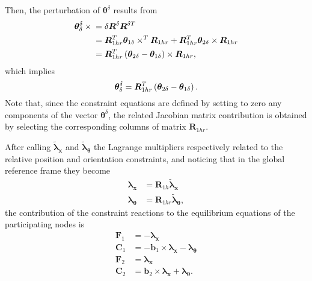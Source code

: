 \documentclass[10pt,fleqn,subeqn]{report}
\newcommand{\T}[1]{\bm{#1}}
\begin{document}
Then, the perturbation of $\T{\theta}^{\delta}$ results from
\begin{align}
	\T{\theta}^{\delta}_{\delta} \times{}
	&= \delta\T{R}^{\delta} \T{R}^{\delta T} \nonumber \\
	&= \T{R}_{1hr}^T \T{\theta}_{1\delta}\times^T \T{R}_{1hr}
	+ \T{R}_{1hr}^T \T{\theta}_{2\delta}\times \T{R}_{1hr} \nonumber \\
	&= \T{R}_{1hr}^T \plbr{
		\T{\theta}_{2\delta} - \T{\theta}_{1\delta}
	} \times \T{R}_{1hr} ,
\end{align}
which implies
\begin{equation}
	\T{\theta}^{\delta}_{\delta} = \T{R}_{1hr}^T \plbr{
		\T{\theta}_{2\delta} - \T{\theta}_{1\delta}
	} .
\end{equation}
Note that, since the constraint equations are defined by setting 
to zero any components of the vector $\T{\theta}^{\delta}$, the
related Jacobian matrix contribution is obtained by selecting 
the corresponding columns of matrix $\T{R}_{1hr}$.


After calling $\tilde{\T{\lambda}}_{\T{x}}$
and $\tilde{\T{\lambda}}_{\T{\theta}}$ the Lagrange multipliers
respectively related to the relative position and orientation
constraints, and noticing that in the global reference frame
they become
\begin{subequations}
\begin{align}
	\T{\lambda}_{\T{x}} &= \T{R}_{1h} \tilde{\T{\lambda}}_{\T{x}} \\
	\T{\lambda}_{\T{\theta}} &= \T{R}_{1hr} \tilde{\T{\lambda}}_{\T{\theta}} ,
\end{align}
\end{subequations}
the contribution of the constraint reactions to the equilibrium equations
of the participating nodes is
\begin{subequations}
\begin{align}
	\T{F}_1 &= - \T{\lambda}_{\T{x}} \\
	\T{C}_1 &= - \T{b}_1 \times \T{\lambda}_{\T{x}} - \T{\lambda}_{\T{\theta}} \\
	\T{F}_2 &= \T{\lambda}_{\T{x}} \\
	\T{C}_2 &= \T{b}_2 \times \T{\lambda}_{\T{x}} + \T{\lambda}_{\T{\theta}} .
\end{align}
\end{subequations}
\end{document}
